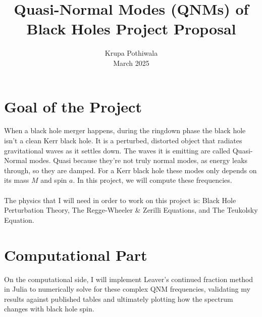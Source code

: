 \documentclass[12pt]{article}
\title{Quasi-Normal Modes (QNMs) of Black Holes Project Proposal}
\author{Krupa Pothiwala \\[0.5em]
March 2025}
\date{}
\begin{document}
\maketitle

\newpage
\section{Goal of the Project}
\label{Goal}
When a black hole merger happens, during the ringdown phase the black hole isn't a clean Kerr black hole. It is a perturbed, distorted object that radiates gravitational waves as it settles down. The waves it is emitting are called Quasi-Normal modes. Quasi because they're not truly normal modes, as energy leaks through, so they are damped. For a Kerr black hole these modes only depends on its mass $M$ and spin $a$. In this project, we will compute these frequencies. 
\\
\\
The physics that I will need in order to work on this project is: Black Hole Perturbation Theory, The Regge-Wheeler \& Zerilli Equations, and The Teukolsky Equation.

\section{Computational Part}
\label{Computer}
On the computational side, I will implement Leaver's continued fraction method in Julia to numerically solve for these complex QNM frequencies, validating my results against published tables and ultimately plotting how the spectrum changes with black hole spin.
\end{document}
